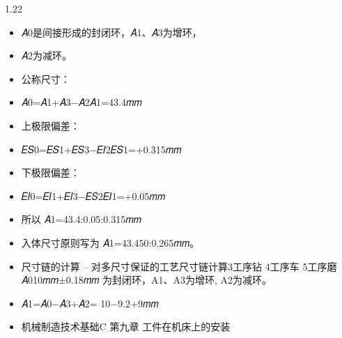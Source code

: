 \documentclass[12pt,a4paper]{article}
\begin{document}
\begin{spacing}{1.22}
\begin{itemize}[leftmargin=2.2em,label=--]
  \item 𝐴0是间接形成的封闭环，𝐴1、𝐴3为增环，
  \item 𝐴2为减环。
  \item 公称尺寸：
  \item 𝐴0=𝐴1+𝐴3−𝐴2𝐴1=43.4𝑚𝑚
  \item 上极限偏差：
  \item 𝐸𝑆0=𝐸𝑆1+𝐸𝑆3−𝐸𝐼2𝐸𝑆1=+0.315𝑚𝑚
  \item 下极限偏差：
  \item 𝐸𝐼0=𝐸𝐼1+𝐸𝐼3−𝐸𝑆2𝐸𝐼1=+0.05𝑚𝑚
  \item 所以 𝐴1=43.4:0.05:0.315𝑚𝑚
  \item 入体尺寸原则写为 𝐴1=43.450:0.265𝑚𝑚。
  \item 尺寸链的计算 – 对多尺寸保证的工艺尺寸链计算3工序钻 4工序车 5工序磨𝐴010𝑚𝑚±0.18𝑚𝑚 为封闭环，A1、A3为增环, A2为减环。
  \item 𝐴1=𝐴0−𝐴3+𝐴2= 10−9.2+9𝑚𝑚
  \item 机械制造技术基础C 第九章 工件在机床上的安装
\end{itemize}


\end{spacing}
\end{document}

